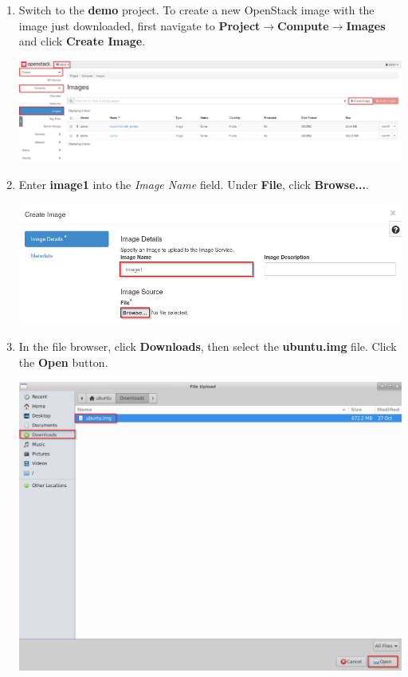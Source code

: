 \documentclass[letterpaper, 12pt]{article}
\begin{document}
\begin{enumerate}
    \item Switch to the \textbf{demo} project. To create a new OpenStack image with the image just downloaded, first
    navigate to \textbf{Project$\rightarrow$Compute$\rightarrow$Images} and click \textbf{Create Image}.

    \begin{center}
        \includegraphics[width=\linewidth]{images/part1/step3.png}
    \end{center}

    \item Enter \textbf{image1} into the \textit{Image Name} field. Under \textbf{File}, click \textbf{Browse...}.
    
    \begin{center}
        \includegraphics[width=\linewidth]{images/part1/step4.png}
    \end{center}

    \item In the file browser, click \textbf{Downloads}, then select the \textbf{ubuntu.img} file. Click the
    \textbf{Open} button.

    \begin{center}
        \includegraphics[width=\linewidth]{images/part1/step5.png}
    \end{center}


\end{enumerate}
\end{document}

